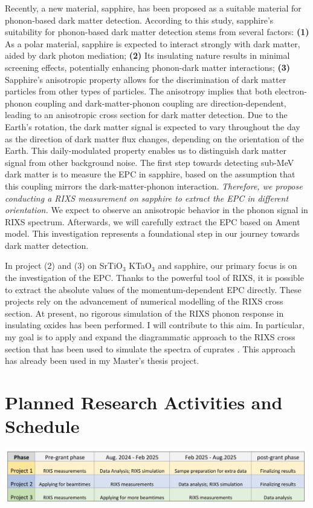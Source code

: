 \documentclass[11pt]{article}
\begin{document}
%
Recently, a new material, sapphire, has been proposed as a suitable material for phonon-based dark matter detection\cite{griffin_directional_2018}. According to this study, sapphire's suitability for phonon-based dark matter detection stems from several factors: 
\textbf{(1)} As a polar material, sapphire is  expected to interact strongly with dark matter, aided by dark photon mediation; 
\textbf{(2)} Its insulating nature results in minimal screening effects, potentially enhancing phonon-dark matter interactions; 
\textbf{(3)} Sapphire's anisotropic property allows for the discrimination of dark matter particles from other types of particles. 
The anisotropy implies that both electron-phonon coupling and dark-matter-phonon coupling are direction-dependent\cite{griffin_directional_2018}, leading to an anisotropic cross section for dark matter detection. 
Due to the Earth's rotation, the dark matter signal is expected to vary throughout the day as the direction of dark matter flux changes, depending on the orientation of the Earth. 
This daily-modulated property enables us to distinguish dark matter signal from other background noise.
The first step towards detecting sub-MeV dark matter is to measure the EPC in sapphire, based on the assumption that this coupling mirrors the dark-matter-phonon interaction. 
\textit{Therefore, we propose conducting a RIXS measurement on sapphire to extract the EPC in different orientation.}  
We expect to observe an anisotropic behavior in the phonon signal in RIXS spectrum. 
Afterwards, we will carefully extract the EPC based on Ament model\cite{ament_determining_2011}. 
This investigation represents a foundational step in our journey towards dark matter detection.

In project (2) and (3) on SrTiO$_{3}$ KTaO$_{3}$ and sapphire, our primary focus is on the investigation of the EPC. 
Thanks to the powerful tool of RIXS, it is possible to extract the absolute values of the momentum-dependent EPC directly. 
These projects rely on the advancement of numerical modelling of the RIXS cross section. At present, no rigorous simulation of the RIXS phonon response in insulating oxides has been performed. I will contribute to this aim. In particular, my goal is to apply and expand the diagrammatic approach to the RIXS cross section that has been used to simulate the spectra of cuprates \cite{devereaux_directly_2016}. This approach has already been used in my Master's thesis project.

\section{Planned Research Activities and Schedule}
\begin{center}
\includegraphics[width=0.99\textwidth]{figures/schedule.jpg}
\end{center}
\end{document}
